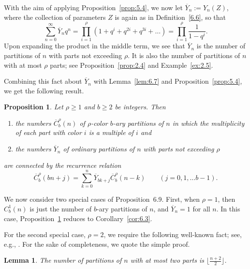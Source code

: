 \documentclass{amsart}
\theoremstyle{plain}
\newtheorem{proposition}[theorem]{Proposition}
\newtheorem{lemma}[theorem]{Lemma}
\numberwithin{equation}{section}
\begin{document}
With the aim of applying Proposition~\ref{prop:5.4}, we now let
$\overline{Y}_n:=Y_n(Z)$, where the collection of parameters $Z$ is again as
in Definition~\ref{6.6}, so that
\begin{equation}\label{6a.4}
\sum_{n=0}^\infty\overline{Y}_nq^n = 
\prod_{i=1}^\rho\left(1+q^i+q^{2i}+q^{3i}+\dots\right)
=\prod_{i=1}^\rho\frac{1}{1-q^i}.
\end{equation}
Upon expanding the product in the middle term, we see that $\overline{Y}_n$
is the number of partitions of $n$ with parts not exceeding $\rho$. It is 
also the number of partitions of $n$ with at most $\rho$ parts; see 
Proposition~\ref{prop:2.4} and Example~\ref{ex:2.5}.

Combining this fact about $\overline{Y}_n$ with Lemma~\ref{lem:6.7} and
Proposition~\ref{prop:5.4}, we get the following result.

\begin{proposition}\label{prop:6.9}
Let $\rho\geq 1$ and $b\geq 2$ be integers. Then
\begin{enumerate}
\item[(a)] the numbers $\overline{C}_b^\rho(n)$ of $\rho$-color $b$-ary 
partitions of $n$ in which the multiplicity of each part with color $i$ is a
multiple of $i$ and
\item[(b)] the numbers $\overline{Y}_n$ of ordinary partitions of $n$ with
parts not exceeding $\rho$
\end{enumerate}
are connected by the recurrence relation
\begin{equation}\label{6a.5}
\overline{C}_b^\rho(bn+j)
=\sum_{k=0}^n\overline{Y}_{bk+j}\overline{C}_b^\rho(n-k) \qquad 
(j=0, 1,\ldots b-1).
\end{equation}
\end{proposition}

We now consider two special cases of Proposition~6.9. First, when $\rho=1$,
then $C_b^1(n)$ is just the number of $b$-ary partitions of $n$, and 
$\overline{Y}_{n}=1$ for all $n$. In this case, Proposition~\ref{prop:6.9}
reduces to Corollary~\ref{cor:6.3}.

For the second special case, $\rho=2$, we require the following well-known
fact; see, e.g., \cite[A004526]{OEIS}. For the sake of completeness, we quote
the simple proof.

\begin{lemma}\label{lem:6.10}
The number of partitions of $n$ with at most two parts is
$\lfloor\frac{n+2}{2}\rfloor$.
\end{lemma}
\end{document}
